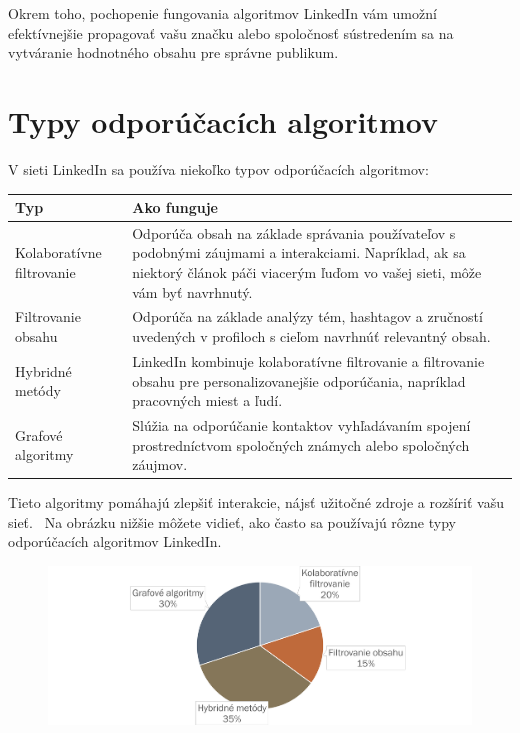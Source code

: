 \documentclass[slovak,a4paper]{coursepaper}
\begin{document}
Okrem toho, pochopenie fungovania algoritmov LinkedIn vám umožní efektívnejšie propagovať vašu značku alebo spoločnosť sústredením sa na vytváranie hodnotného obsahu pre správne publikum.

\newpage
\section{Typy odporúčacích algoritmov} \label{Typy}
V sieti LinkedIn sa používa niekoľko typov odporúčacích algoritmov:


\begin{table}[h!]
    \begin{tabularx}{\textwidth}{|>{\centering\arraybackslash}l|X|}
        \hline
        \textbf{Typ} & \textbf{Ako funguje} 
		\\ \hline Kolaboratívne filtrovanie & Odporúča obsah na základe správania používateľov 
		s podobnými záujmami a interakciami. Napríklad, ak sa niektorý článok páči viacerým ľuďom vo vašej sieti, môže vám byť navrhnutý.

		\\ \hline Filtrovanie obsahu & Odporúča na základe analýzy tém, hashtagov a zručností uvedených v profiloch s cieľom navrhnúť relevantný obsah.  
		\\ \hline Hybridné metódy & LinkedIn kombinuje kolaboratívne filtrovanie a filtrovanie obsahu pre personalizovanejšie odporúčania, napríklad pracovných miest a ľudí.
		\\ \hline Grafové algoritmy & Slúžia na odporúčanie kontaktov vyhľadávaním spojení prostredníctvom spoločných známych alebo spoločných záujmov.
		\\ \hline
    \end{tabularx}
    \label{tab:typy}
\end{table}

Tieto algoritmy pomáhajú zlepšiť interakcie, nájsť užitočné zdroje a rozšíriť vašu sieť.~\cite{Kohút:article} Na obrázku nižšie môžete vidieť, ako často sa používajú rôzne typy odporúčacích algoritmov LinkedIn.

\begin{figure}[H]
	\hspace*{-3cm}
	\includegraphics[width=1.4\textwidth]{graph.png}
\end{figure}
\end{document}

